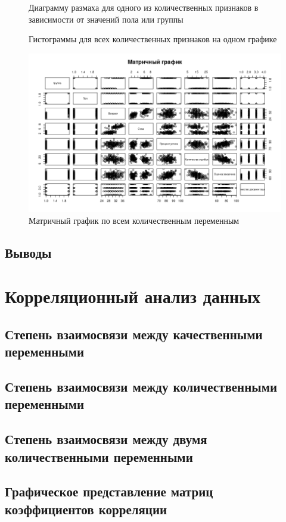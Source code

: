 \begin{figure}[H]
	\centering
	
	\caption{Диаграмму размаха для одного из количественных признаков в зависимости от значений пола или группы}
\end{figure}

\begin{figure}[H]
	\centering
	
	\caption{Гистограммы для всех количественных признаков на одном графике}
\end{figure}

\begin{figure}[H]
	\centering
	\includegraphics[width=\linewidth]{fig1}
	\caption{Матричный график по всем количественным переменным}
\end{figure}

\subsection{Выводы}














\section{Корреляционный анализ данных}

\subsection{Степень взаимосвязи между качественными переменными}

\subsection{Степень взаимосвязи между количественными переменными}

\subsection{Степень взаимосвязи между двумя количественными переменными}

\subsection{Графическое представление матриц коэффициентов корреляции}